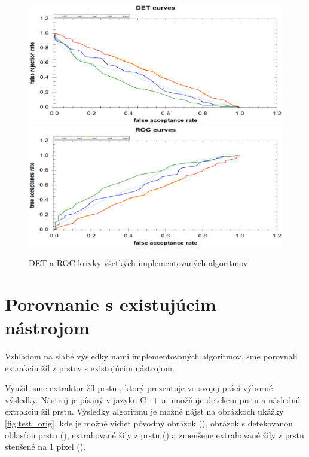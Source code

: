 \documentclass[11pt,a4paper]{article}
\begin{document}
\vfill
\begin{figure}[ht!]
	\centering
	\includegraphics[width=17cm]{fig/det_all.eps}
	\includegraphics[width=17cm]{fig/roc_all.eps}
	\caption{\label{fig:all} DET a ROC krivky všetkých implementovaných algoritmov}
\end{figure}
\vfill
\vfill

\clearpage
\section{Porovnanie s existujúcim nástrojom} \label{konalio}

Vzhľadom na slabé výsledky nami implementovaných algoritmov, sme porovnali
extrakciu žíl z prstov s existujúcim nástrojom.

Využili sme extraktor žíl prstu \cite{konalio}, ktorý prezentuje vo svojej práci
výborné výsledky. Nástroj je písaný v jazyku C++ a umožňuje detekciu prstu
a následnú extrakciu žíl prstu. Výsledky algoritmu je možné nájsť na obrázkoch
ukážky \ref{fig:test_orig}, kde je možné vidieť pôvodný obrázok
(), obrázok s detekovanou oblasťou prstu
(), extrahované žily z prstu () a zmenšene extrahované žily z prstu stenšené na 1 pixel
().
\end{document}
